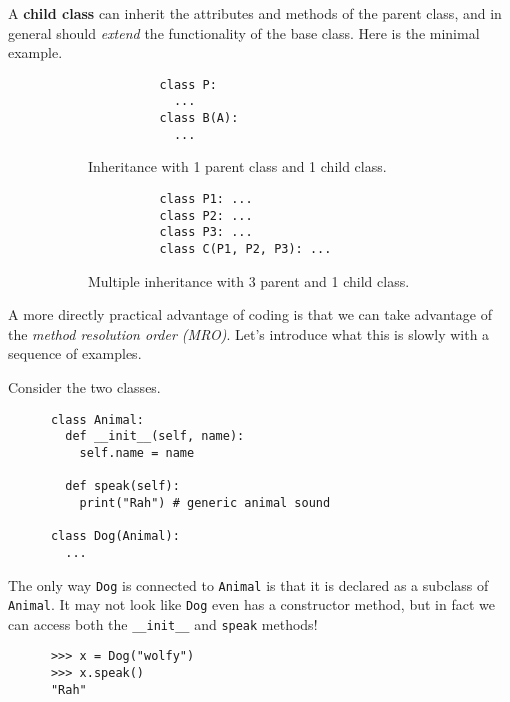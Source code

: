   \begin{definition}
    A \textbf{child class} can inherit the attributes and methods of the parent class, and in general should \textit{extend} the functionality of the base class. Here is the minimal example. 

    \begin{figure}[H]
      \centering
      \begin{subfigure}[b]{0.48\textwidth}
        \centering
        \begin{lstlisting}
          class P: 
            ... 
          class B(A): 
            ...
        \end{lstlisting}
        \caption{Inheritance with 1 parent class and 1 child class.}
      \end{subfigure}
      \hfill 
      \begin{subfigure}[b]{0.48\textwidth}
        \centering
        \begin{lstlisting}
          class P1: ... 
          class P2: ...
          class P3: ... 
          class C(P1, P2, P3): ...
        \end{lstlisting}
        \caption{Multiple inheritance with 3 parent and 1 child class.}
      \end{subfigure}
      \caption{}
    \end{figure}
  \end{definition}

  A more directly practical advantage of coding is that we can take advantage of the \textit{method resolution order (MRO)}. Let's introduce what this is slowly with a sequence of examples. 

  \begin{example}
    Consider the two classes. 
    \begin{lstlisting}
      class Animal: 
        def __init__(self, name): 
          self.name = name 

        def speak(self): 
          print("Rah") # generic animal sound

      class Dog(Animal): 
        ...
    \end{lstlisting} 
    The only way \texttt{Dog} is connected to \texttt{Animal} is that it is declared as a subclass of \texttt{Animal}. It may not look like \texttt{Dog} even has a constructor method, but in fact we can access both the \texttt{\_\_init\_\_} and \texttt{speak} methods! 
    \begin{lstlisting} 
      >>> x = Dog("wolfy") 
      >>> x.speak() 
      "Rah"
    \end{lstlisting}
  \end{example} 

